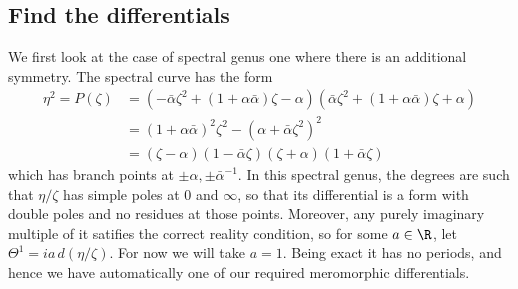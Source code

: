 \documentclass{article}
\begin{document}
\subsection{Find the differentials}

We first look at the case of spectral genus one where there is an additional symmetry. The spectral curve has the form
\begin{align*}
η ^2 = P( ζ  )
&= (-\bar{α}  ζ ^2 + (1 + α  \bar{α} )ζ  - α )(\bar{α} ζ ^2 + (1 + α  \bar{α} )ζ  +  α  )\\
&= (1+ α \bar{α} )^2  ζ ^2 - (α  +\bar{α} ζ ^2)^2\\
&= ( ζ  - α  )(1-\bar{α}   ζ  )( ζ  + α  )(1+\bar{α}   ζ  )
\end{align*}
which has branch points at $\pm α  , \pm\bar{α}  ^{-1}$. In this spectral genus, the degrees are such that $ η  / ζ  $ has simple poles at $0$ and $\infty$, so that its differential is a form with double poles and no residues at those points. Moreover, any purely imaginary multiple of it satifies the correct reality condition, so for some $a\in\R$, let $Θ^1 = ia\,d( η  / ζ  )$. For now we will take $a=1$. Being exact it has no periods, and hence we have automatically one of our required meromorphic differentials.
\end{document}
